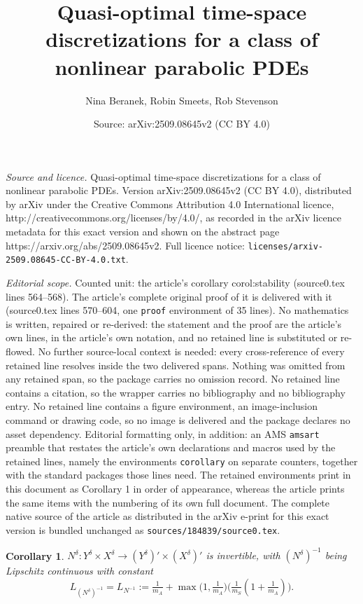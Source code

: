\documentclass[10pt,a4paper]{amsart}
\title{Quasi-optimal time-space discretizations for a class of nonlinear parabolic PDEs}
\author{Nina Beranek, Robin Smeets, Rob Stevenson}
\date{Source: arXiv:2509.08645v2 (CC BY 4.0)}
\newtheorem{corollary}{Corollary}
\newcommand{\NN}{N}
\begin{document}
\maketitle

\noindent\emph{Source and licence.} Quasi-optimal time-space discretizations for a class of nonlinear parabolic PDEs. Version arXiv:2509.08645v2 (CC BY 4.0), distributed by arXiv under the Creative Commons Attribution 4.0 International licence, http://creativecommons.org/licenses/by/4.0/, as recorded in the arXiv licence metadata for this exact version and shown on the abstract page https://arxiv.org/abs/2509.08645v2. Full licence notice: \texttt{licenses/arxiv-2509.08645-CC-BY-4.0.txt}.\par\smallskip

\noindent\textit{Editorial scope.} Counted unit: the article's corollary corol:stability (source0.tex lines 564--568). The article's complete original proof of it is delivered with it (source0.tex lines 570--604, one \texttt{proof} environment of 35 lines). No mathematics is written, repaired or re-derived: the statement and the proof are the article's own lines, in the article's own notation, and no retained line is substituted or re-flowed.  No further source-local context is needed: every cross-reference of every retained line resolves inside the two delivered spans.  Nothing was omitted from any retained span, so the package carries no omission record.  No retained line contains a citation, so the wrapper carries no bibliography and no bibliography entry.  No retained line contains a figure environment, an image-inclusion command or drawing code, so no image is delivered and the package declares no asset dependency.  Editorial formatting only, in addition: an AMS \texttt{amsart} preamble that restates the article's own declarations and macros used by the retained lines, namely the environments \texttt{corollary} on separate counters, together with the standard packages those lines need.  The retained environments print in this document as Corollary 1 in order of appearance, whereas the article prints the same items with the numbering of its own full document.  The complete native source of the article as distributed in the arXiv e-print for this exact version is bundled unchanged as \texttt{sources/184839/source0.tex}.
\begin{corollary} \label{corol:stability} $\NN^\delta\colon Y^\delta \times X^\delta \rightarrow (Y^\delta)' \times (X^\delta)'$ is invertible, with $(\NN^\delta)^{-1}$  being \emph{Lipschitz continuous} with constant
 $$
 L_{(\NN^\delta)^{-1}}= L_{\NN^{-1}}:=\tfrac{1}{m_A}+\max\big(1,\tfrac{1}{m_A})\big(\tfrac{1}{m_S}(1+\tfrac{1}{m_A})\big).
 $$ 
\end{corollary}
\end{document}
